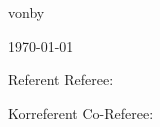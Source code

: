 \begin{titlepage}
\begin{center}
{von}{by}
\par\end{center}

\begin{center}
\theAuthor
\par\end{center}

\begin{center}
\today
\par\end{center}

\vspace{1.5cm}

{Referent}
{Referee}: \theFirstReferee

{Korreferent}
{Co-Referee}: \theSecondReferee

\end{titlepage}


\thispagestyle{empty}

\cleardoublepage

\printGenerativeAIDeclaration

\printDeclarationOfIndependence

\clearpage
\mbox{}\thispagestyle{empty}

